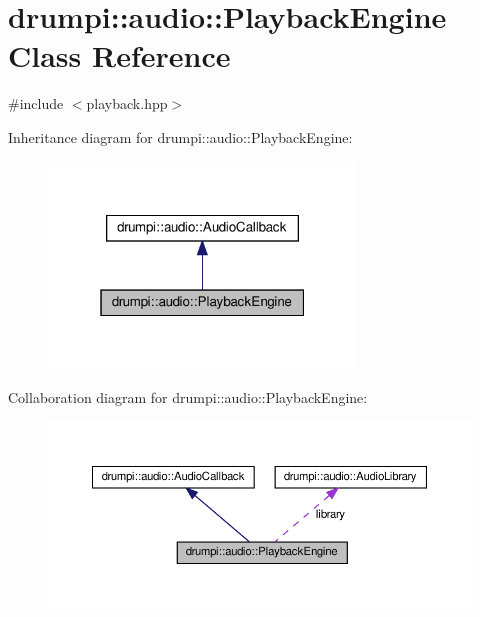 \hypertarget{classdrumpi_1_1audio_1_1PlaybackEngine}{}\section{drumpi\+:\+:audio\+:\+:Playback\+Engine Class Reference}
\label{classdrumpi_1_1audio_1_1PlaybackEngine}


{\ttfamily \#include $<$playback.\+hpp$>$}



Inheritance diagram for drumpi\+:\+:audio\+:\+:Playback\+Engine\+:
\nopagebreak
\begin{figure}[H]
\begin{center}
\leavevmode
\includegraphics[width=232pt]{classdrumpi_1_1audio_1_1PlaybackEngine__inherit__graph}
\end{center}
\end{figure}


Collaboration diagram for drumpi\+:\+:audio\+:\+:Playback\+Engine\+:
\nopagebreak
\begin{figure}[H]
\begin{center}
\leavevmode
\includegraphics[width=350pt]{classdrumpi_1_1audio_1_1PlaybackEngine__coll__graph}
\end{center}
\end{figure}
